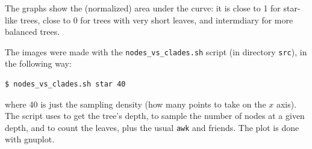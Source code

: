The graphs show the (normalized) area under the curve: it is close to 1 for star-like trees, close to 0 for trees with very short leaves, and intermdiary for more balanced trees.

The images were made with the \texttt{nodes\_vs\_clades.sh} script (in
directory \texttt{src}), in the following way:
\begin{verbatim}
$ nodes_vs_clades.sh star 40
\end{verbatim}
where 40 is just the sampling density (how many points to take on the $x$
axis). The script uses \distance{} to get the tree's depth, \ed{} to sample the number of nodes at a given depth, and \nwindent{} to count the leaves, plus the usual \texttt{awk} and friends. The plot is done with gnuplot.
